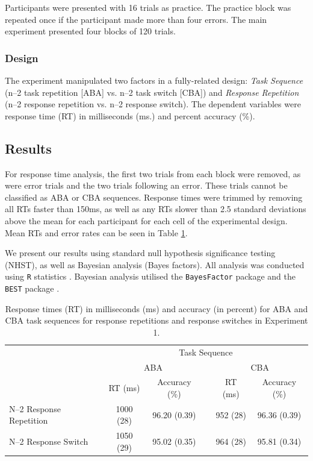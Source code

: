 \documentclass[a4paper, doc, natbib]{apa6}
\begin{document}
Participants were presented with 16 trials as practice. The practice block was repeated once if the participant made more than four errors. The main experiment presented four blocks of 120 trials. 

\subsubsection{Design}
The experiment manipulated two factors in a fully-related design: \emph{Task Sequence} (n--2 task repetition [ABA] vs. n--2 task switch [CBA]) and \emph{Response Repetition} (n--2 response repetition vs. n--2 response switch). The dependent variables were response time (RT) in milliseconds (ms.) and percent accuracy (\%).


\subsection{Results}
For response time analysis, the first two trials from each block were removed, as were error trials and the two trials following an error. These trials cannot be classified as ABA or CBA sequences. Response times were trimmed by removing all RTs faster than 150ms, as well as any RTs slower than 2.5 standard deviations above the mean for each participant for each cell of the experimental design. Mean RTs and error rates can be seen in Table \ref{tab:Experiment1}.

We present our results using standard null hypothesis significance testing (NHST), as well as Bayesian analysis (Bayes factors). All analysis was conducted using \texttt{R} statistics \citep{RCore2015}. Bayesian analysis utilised the \texttt{BayesFactor} package \citep{Morey2015} and the \texttt{BEST} package \citep{Kruschke2013}.

\begin{table}[htbp]
\centering
\caption{Response times (RT) in milliseconds (ms) and accuracy (in percent) for ABA and CBA task sequences for response repetitions and response switches in Experiment 1.}
\begin{tabular}{lccccc}
\hline
                    & \multicolumn{5}{c}{Task Sequence}                       \\ \cline{2-6} 
                    & \multicolumn{2}{c}{ABA}   &  & \multicolumn{2}{c}{CBA}  \\ \cline{2-3} \cline{5-6} 
                    & RT (ms)   & Accuracy (\%) &  & RT (ms)  & Accuracy (\%) \\ \hline
N--2 Response Repetition & 1000 (28) & 96.20 (0.39)  &  & 952 (28) & 96.36 (0.39) \\
N--2 Response Switch     & 1050 (29) & 95.02 (0.35)  &  & 964 (28) & 95.81 (0.34) \\ \hline
\end{tabular}
\label{tab:Experiment1}
\end{table}
\end{document}
